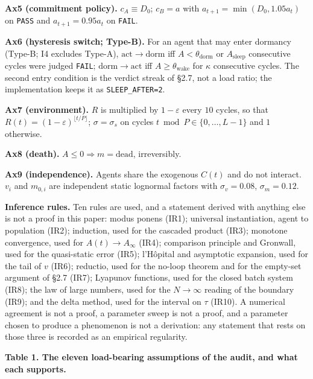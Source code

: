 \documentclass[11pt,a4paper]{article}
\begin{document}
\textbf{Ax5 (commitment policy).} \(c_A\equiv D_0\); \(c_B=a\) with
\(a_{t+1}=\min(D_0,1.05a_t)\) on \texttt{PASS} and \(a_{t+1}=0.95a_t\) on \texttt{FAIL}.

\textbf{Ax6 (hysteresis switch; Type-B).} For an agent that may enter dormancy
(Type-B; I4 excludes Type-A), \(\mathrm{act}\to\mathrm{dorm}\) iff
\(A<\theta_{\mathrm{dorm}}\) or \(A_{\mathrm{sleep}}\) consecutive cycles were judged
\texttt{FAIL}; \(\mathrm{dorm}\to\mathrm{act}\) iff \(A\ge\theta_{\mathrm{wake}}\) for
\(\kappa\) consecutive cycles. The second entry condition is the verdict streak of
§2.7, not a load ratio; the implementation keeps it as \texttt{SLEEP\_AFTER=2}.

\textbf{Ax7 (environment).} \(R\) is multiplied by \(1-\varepsilon\) every \(10\) cycles,
so that \(R(t)=(1-\varepsilon)^{\lfloor t/P\rfloor}\);
\(\sigma=\sigma_s\) on cycles \(t\bmod P\in\{0,\dots,L-1\}\) and \(1\) otherwise.

\textbf{Ax8 (death).} \(A\le0\Rightarrow m=\mathrm{dead}\), irreversibly.

\textbf{Ax9 (independence).} Agents share the exogenous \(C(t)\) and do not interact.
\(v_i\) and \(m_{0,i}\) are independent static lognormal factors with
\(\sigma_v=0.08\), \(\sigma_m=0.12\).

\textbf{Inference rules.} Ten rules are used, and a statement derived with anything
else is not a proof in this paper: modus ponens (IR1); universal instantiation,
agent to population (IR2); induction, used for the cascaded product (IR3);
monotone convergence, used for \(A(t)\to A_\infty\) (IR4); comparison principle and
Gronwall, used for the quasi-static error (IR5); l'Hôpital and asymptotic
expansion, used for the tail of \(v\) (IR6); reductio, used for the no-loop theorem
and for the empty-set argument of §2.7 (IR7); Lyapunov functions, used for the
closed batch system (IR8); the law of large numbers, used for the \(N\to\infty\)
reading of the boundary (IR9); and the delta method, used for the interval on
\(\tau\) (IR10). A numerical agreement is not a proof, a parameter sweep is not a
proof, and a parameter chosen to produce a phenomenon is not a derivation: any
statement that rests on those three is recorded as an empirical regularity.

\textbf{Table 1. The eleven load-bearing assumptions of the audit, and what each supports.}
\end{document}
